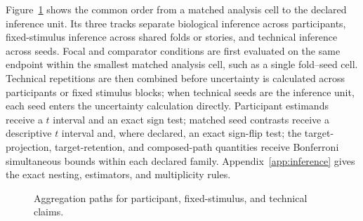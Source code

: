 Figure~\ref{fig:aggregation-paths} shows the common order from a matched analysis cell to the declared inference unit.
Its three tracks separate biological inference across participants, fixed-stimulus inference across shared folds or stories, and technical inference across seeds.
Focal and comparator conditions are first evaluated on the same endpoint within the smallest matched analysis cell, such as a single fold--seed cell.
Technical repetitions are then combined before uncertainty is calculated across participants or fixed stimulus blocks; when technical seeds are the inference unit, each seed enters the uncertainty calculation directly.
Participant estimands receive a \(t\) interval and an exact sign test; matched seed contrasts receive a descriptive \(t\) interval and, where declared, an exact sign-flip test; the target-projection, target-retention, and composed-path quantities receive Bonferroni simultaneous bounds within each declared family.
Appendix~\ref{app:inference} gives the exact nesting, estimators, and multiplicity rules.

\begin{figure}[tbp]
  \centering
  \resizebox{\textwidth}{!}{}
  \caption{Aggregation paths for participant, fixed-stimulus, and technical claims.}
  \label{fig:aggregation-paths}
\end{figure}

